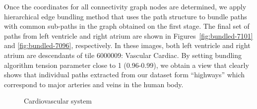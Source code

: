 Once the coordinates for all connectivity graph nodes are determined, we apply hierarchical edge bundling method that uses the path structure to bundle paths with common sub-paths in the graph obtained on the first stage. The final set of paths from left ventricle and right atrium are shown in Figures~\ref{fig:bundled-7101} and \ref{fig:bundled-7096}, respectively. In these images, both left ventricle and right atrium are descendants of tile 6000009: Vascular Cardiac. By setting bundling algorithm tension parameter close to 1 (0.96-0.99), we obtain a view that clearly shows that individual paths extracted from our dataset form ``highways'' which correspond to major arteries and veins in the human body.

\begin{figure}
\centering
  \caption{Cardiovascular system}
  \label{fig:vascular-connectivity}
\end{figure}

